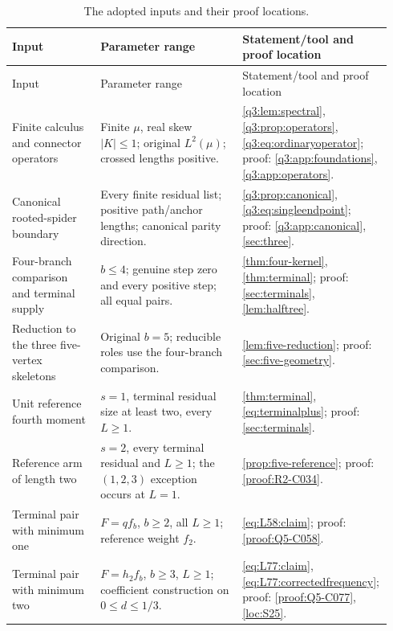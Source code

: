 \begingroup\small
\setlength{\tabcolsep}{3pt}
\begin{longtable}{@{}p{0.23\linewidth}p{0.37\linewidth}p{0.34\linewidth}@{}}
\caption{The adopted inputs and their proof locations.}\label{tab:referee-entry-map}\\
\toprule
Input & Parameter range & Statement/tool and proof location\\
\midrule\endfirsthead
\toprule
Input & Parameter range & Statement/tool and proof location\\
\midrule\endhead
\bottomrule\endfoot
Finite calculus and connector operators & Finite $\mu$, real skew $|K|\le1$; original $L^2(\mu)$; crossed lengths positive. & \ref{q3:lem:spectral}, \ref{q3:prop:operators}, \eqref{q3:eq:ordinaryoperator}; proof: \ref{q3:app:foundations}, \ref{q3:app:operators}. \\
\addlinespace[2pt]
Canonical rooted-spider boundary & Every finite residual list; positive path/anchor lengths; canonical parity direction. & \ref{q3:prop:canonical}, \eqref{q3:eq:singleendpoint}; proof: \ref{q3:app:canonical}, \ref{sec:three}. \\
\addlinespace[2pt]
Four-branch comparison and terminal supply & $b\le4$; genuine step zero and every positive step; all equal pairs. & \ref{thm:four-kernel}, \ref{thm:terminal}; proof: \ref{sec:terminals}, \ref{lem:halftree}. \\
\addlinespace[2pt]
Reduction to the three five-vertex skeletons & Original $b=5$; reducible roles use the four-branch comparison. & \ref{lem:five-reduction}; proof: \ref{sec:five-geometry}. \\
\addlinespace[2pt]
Unit reference fourth moment & $s=1$, terminal residual size at least two, every $L\ge1$. & \ref{thm:terminal}, \eqref{eq:terminalplus}; proof: \ref{sec:terminals}. \\
\addlinespace[2pt]
Reference arm of length two & $s=2$, every terminal residual and $L\ge1$; the $(1,2,3)$ exception occurs at $L=1$. & \ref{prop:five-reference}; proof: \ref{proof:R2-C034}. \\
\addlinespace[2pt]
Terminal pair with minimum one & $F=qf_b$, $b\ge2$, all $L\ge1$; reference weight $f_2$. & \eqref{eq:L58:claim}; proof: \ref{proof:Q5-C058}. \\
\addlinespace[2pt]
Terminal pair with minimum two & $F=h_2f_b$, $b\ge3$, $L\ge1$; coefficient construction on $0\le d\le1/3$. & \eqref{eq:L77:claim}, \eqref{eq:L77:correctedfrequency}; proof: \ref{proof:Q5-C077}, \ref{loc:S25}. \\

\end{longtable}

